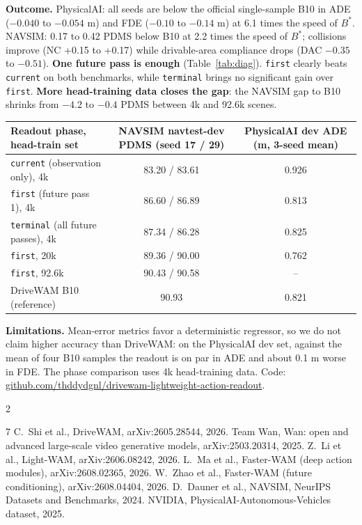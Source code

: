 \documentclass[nouppercase]{kaia}
\makeatletter
\newenvironment{posterrefs}{\par\vspace{2pt}\noindent{\small\textbf{References}}\par
  \def\@openbib@code{\scriptsize\setlength{\itemsep}{0pt}\setlength{\parsep}{0pt}\setlength{\topsep}{0pt}}%
  \let\section\@gobbletwo
  \setlength{\multicolsep}{0pt}\vspace{-0.8\baselineskip}%
  \begin{multicols}{2}\begin{thebibliography}{7}}{\end{thebibliography}\end{multicols}}
\makeatother
\begin{document}
\begin{mdframed}
\textbf{Outcome.} PhysicalAI: all seeds are below the official single-sample B10 in ADE ($-0.040$ to $-0.054$ m) and FDE ($-0.10$ to $-0.14$ m) at 6.1 times the speed of $B^{*}$. NAVSIM: 0.17 to 0.42 PDMS below B10 at 2.2 times the speed of $B^{*}$; collisions improve (NC +0.15 to +0.17) while drivable-area compliance drops (DAC $-0.35$ to $-0.51$).
\textbf{One future pass is enough} (Table~\ref{tab:diag}). \texttt{first} clearly beats \texttt{current} on both benchmarks, while \texttt{terminal} brings no significant gain over \texttt{first}. \textbf{More head-training data closes the gap}: the NAVSIM gap to B10 shrinks from $-4.2$ to $-0.4$ PDMS between 4k and 92.6k scenes.
\begin{center}
\footnotesize
\setlength{\tabcolsep}{6pt}
\begin{tabular}{lcc}
\toprule
Readout phase, head-train set & NAVSIM navtest-dev PDMS (seed 17 / 29) & PhysicalAI dev ADE (m, 3-seed mean) \\
\midrule
\texttt{current} (observation only), 4k & 83.20 / 83.61 & 0.926 \\
\texttt{first} (future pass 1), 4k & 86.60 / 86.89 & 0.813 \\
\texttt{terminal} (all future passes), 4k & 87.34 / 86.28 & 0.825 \\
\texttt{first}, 20k & 89.36 / 90.00 & 0.762 \\
\texttt{first}, 92.6k & 90.43 / 90.58 & -- \\
DriveWAM B10 (reference) & 90.93 & 0.821 \\
\bottomrule
\end{tabular}
\label{tab:diag}
\end{center}

\textbf{Limitations.} Mean-error metrics favor a deterministic regressor, so we do not claim higher accuracy than DriveWAM: on the PhysicalAI dev set, against the mean of four B10 samples the readout is on par in ADE and about 0.1 m worse in FDE. The phase comparison uses 4k head-training data. Code: \url{github.com/thddydgnl/drivewam-lightweight-action-readout}.

\begin{posterrefs}
 C.~Shi et al., DriveWAM, arXiv:2605.28544, 2026.
 Team Wan, Wan: open and advanced large-scale video generative models, arXiv:2503.20314, 2025.
 Z.~Li et al., Light-WAM, arXiv:2606.08242, 2026.
 L.~Ma et al., Faster-WAM (deep action modules), arXiv:2608.02365, 2026.
 W.~Zhao et al., Faster-WAM (future conditioning), arXiv:2608.04404, 2026.
 D.~Dauner et al., NAVSIM, NeurIPS Datasets and Benchmarks, 2024.
 NVIDIA, PhysicalAI-Autonomous-Vehicles dataset, 2025.
\end{posterrefs}

\end{mdframed}
\end{document}
